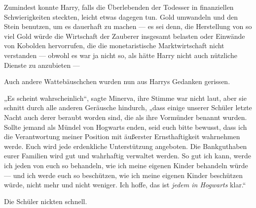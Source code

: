 Zumindest konnte Harry, falls die Überlebenden der Todesser in finanziellen Schwierigkeiten steckten, leicht etwas dagegen tun. Gold umwandeln und den Stein benutzen, um es dauerhaft zu machen — es sei denn, die Herstellung von so viel Gold würde die Wirtschaft der Zauberer insgesamt belasten oder Einwände von Kobolden hervorrufen, die die monetaristische Marktwirtschaft nicht verstanden — obwohl es war ja nicht so, als hätte Harry nicht auch nützliche Dienste zu anzubieten —

Auch andere Wattebäuschchen wurden nun aus Harrys Gedanken gerissen.

„Es scheint wahrscheinlich“, sagte Minerva, ihre Stimme war nicht laut, aber sie schnitt durch alle anderen Geräusche hindurch, „dass einige unserer Schüler letzte Nacht auch derer beraubt worden sind, die als ihre Vormünder benannt wurden. Sollte jemand als Mündel von Hogwarts enden, seid euch bitte bewusst, dass ich die Verantwortung meiner Position mit äußerster Ernsthaftigkeit wahrnehmen werde. Euch wird jede erdenkliche Unterstützung angeboten. Die Bankguthaben eurer Familien wird gut und wahrhaftig verwaltet werden. So gut ich kann, werde ich jeden von euch so behandeln, wie ich meine eigenen Kinder behandeln würde — und ich werde euch so beschützen, wie ich meine eigenen Kinder beschützen würde, nicht mehr und nicht weniger. Ich hoffe, das ist \emph{jedem in Hogwarts} klar.“

Die Schüler nickten schnell.


